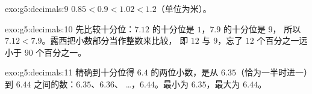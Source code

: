 \begin{solution}{exo:g5:decimals:9}
$0.85 < 0.9 < 1.02 < 1.2$（单位为米）。
\end{solution}

\begin{solution}{exo:g5:decimals:10}
先比较十分位：$7.12$ 的十分位是 $1$，$7.9$ 的十分位是 $9$，
所以 $7.12 < 7.9$。露西把小数部分当作整数来比较，
即 $12$ 与 $9$，忘了 $12$ 个百分之一远小于
$90$ 个百分之一。
\end{solution}

\begin{solution}{exo:g5:decimals:11}
精确到十分位得 $6.4$ 的两位小数，是从
$6.35$（恰为一半时进一）到 $6.44$ 之间的数：$6.35$、$6.36$、
\dots，$6.44$。最小为 $6.35$，最大为 $6.44$。
\end{solution}
